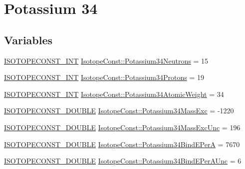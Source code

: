 \hypertarget{group___isotope_const-_potassium-_k34}{}\section{Potassium 34}
\label{group___isotope_const-_potassium-_k34}
\subsection*{Variables}
\begin{DoxyCompactItemize}
\item 
\mbox{\hyperlink{group___isotope_const-_macros_ga5f18360b3e99483a35c32d789e62621c}{I\+S\+O\+T\+O\+P\+E\+C\+O\+N\+S\+T\+\_\+\+I\+NT}} \mbox{\hyperlink{group___isotope_const-_potassium-_k34_ga3958c7acf4c13e5eb5131838068e0934}{Isotope\+Const\+::\+Potassium34\+Neutrons}} = 15
\item 
\mbox{\hyperlink{group___isotope_const-_macros_ga5f18360b3e99483a35c32d789e62621c}{I\+S\+O\+T\+O\+P\+E\+C\+O\+N\+S\+T\+\_\+\+I\+NT}} \mbox{\hyperlink{group___isotope_const-_potassium-_k34_ga5fb0e172819ee49443ca4f35bff5ed3c}{Isotope\+Const\+::\+Potassium34\+Protons}} = 19
\item 
\mbox{\hyperlink{group___isotope_const-_macros_ga5f18360b3e99483a35c32d789e62621c}{I\+S\+O\+T\+O\+P\+E\+C\+O\+N\+S\+T\+\_\+\+I\+NT}} \mbox{\hyperlink{group___isotope_const-_potassium-_k34_ga4b038b2bbb4063ba7462d9d5d5f40b86}{Isotope\+Const\+::\+Potassium34\+Atomic\+Weight}} = 34
\item 
\mbox{\hyperlink{group___isotope_const-_macros_ga8f45a7272ce02c0b4c65c44636ed719a}{I\+S\+O\+T\+O\+P\+E\+C\+O\+N\+S\+T\+\_\+\+D\+O\+U\+B\+LE}} \mbox{\hyperlink{group___isotope_const-_potassium-_k34_gad91735a3fe86f914f8c8f7aa4d08d002}{Isotope\+Const\+::\+Potassium34\+Mass\+Exc}} = -\/1220
\item 
\mbox{\hyperlink{group___isotope_const-_macros_ga8f45a7272ce02c0b4c65c44636ed719a}{I\+S\+O\+T\+O\+P\+E\+C\+O\+N\+S\+T\+\_\+\+D\+O\+U\+B\+LE}} \mbox{\hyperlink{group___isotope_const-_potassium-_k34_gac1837d51fa977d5c39cd1ad815d2fcc3}{Isotope\+Const\+::\+Potassium34\+Mass\+Exc\+Unc}} = 196
\item 
\mbox{\hyperlink{group___isotope_const-_macros_ga8f45a7272ce02c0b4c65c44636ed719a}{I\+S\+O\+T\+O\+P\+E\+C\+O\+N\+S\+T\+\_\+\+D\+O\+U\+B\+LE}} \mbox{\hyperlink{group___isotope_const-_potassium-_k34_gabbdb3eab23d6c71cb8c4b041515a677b}{Isotope\+Const\+::\+Potassium34\+Bind\+E\+PerA}} = 7670
\item 
\mbox{\hyperlink{group___isotope_const-_macros_ga8f45a7272ce02c0b4c65c44636ed719a}{I\+S\+O\+T\+O\+P\+E\+C\+O\+N\+S\+T\+\_\+\+D\+O\+U\+B\+LE}} \mbox{\hyperlink{group___isotope_const-_potassium-_k34_ga42e03bd40dcb4a2844809eb7d8d4383c}{Isotope\+Const\+::\+Potassium34\+Bind\+E\+Per\+A\+Unc}} = 6

\end{DoxyCompactItemize}
